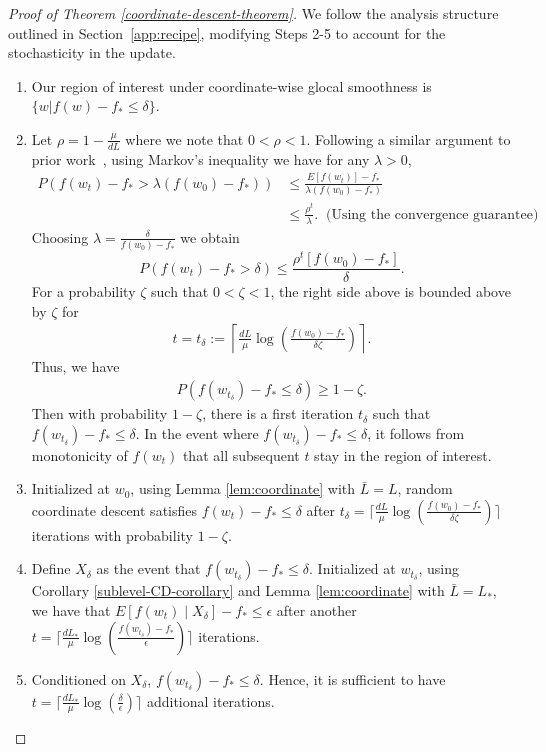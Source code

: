 \documentclass[10pt]{article} %
\begin{document}
\begin{proof}[Proof of Theorem \ref{coordinate-descent-theorem}]
We follow the analysis structure outlined in Section~\ref{app:recipe}, modifying Steps 2-5 to account for the stochasticity in the update.
\begin{enumerate}
\item Our region of interest under coordinate-wise glocal smoothness is $\{w \vert f(w) - f_* \leq \delta\}$.
\item Let $\rho = 1 - \frac{\mu}{dL}$ where we note that $0 < \rho < 1$. Following a similar argument to prior work~\cite[Theorem~5]{konevcny2017semi}, using Markov's inequality we have for any $\lambda > 0$,
          \begin{align*}
              P(f(w_t) - f_* > \lambda (f(w_0) - f_*))
               & \leq \frac{E[f(w_t)] - f_*}{\lambda (f(w_0) - f_*)} \\
               & \leq \frac{\rho^{t}}{\lambda}. \; \; \text{(Using the convergence guarantee)}
          \end{align*}
Choosing $\lambda = \frac{\delta}{f(w_0) - f_*}$ we obtain 
\[
P(f(w_t) - f_* > \delta) \leq \frac{\rho^t[f(w_0) - f_*]}{\delta}.
\]
For a probability $\zeta$ such that $0 < \zeta < 1$, the right side above is bounded above by $\zeta$ for
          \begin{align*}
          \label{eq:coord-hp}
              t = t_\delta := \left\lceil\frac{dL}{\mu}\log\left(\frac{f(w_0) - f_*}{\delta\zeta}\right)\right\rceil.
          \end{align*} Thus, we have
          \begin{align*}
              P(f(w_{t_\delta}) - f_*  \leq \delta) \geq 1 - \zeta.
          \end{align*} 
Then with probability $1 - \zeta$, there is a first iteration $t_\delta$ such that $f(w_{t_\delta}) - f_* \leq \delta$. In the event where $f(w_{t_\delta}) -  f_* \leq \delta$, it follows from monotonicity of $f(w_t)$ that all subsequent $t$ stay in the region of interest.
\item Initialized at $w_0$, using Lemma \ref{lem:coordinate} with $\bar{L} = L$, random coordinate descent satisfies $f(w_t) - f_{*} \leq \delta$ after $t_\delta = \lceil \frac{dL}{\mu}\log\left(\frac{f(w_0) - f_*}{\delta\zeta}\right) \rceil$ iterations with probability $1 - \zeta$. 
\item Define $X_{\delta}$ as the event that $f(w_{t_{\delta}}) - f_{*} \leq \delta$. Initialized at $w_{t_\delta}$, using Corollary \ref{sublevel-CD-corollary} and Lemma \ref{lem:coordinate} with $\bar{L} = L_{*}$, we have that $E[f(w_t)\;|\;X_{\delta}] - f_{*} \leq \epsilon$ after another $t = \lceil \frac{dL_{*}}{\mu}\log\left(\frac{f(w_{t_\delta}) - f_*}{\epsilon}\right) \rceil$ iterations.
\item Conditioned on $X_\delta$, $f(w_{t_\delta}) - f_* \leq \delta$. Hence, it is sufficient to have $t = \lceil \frac{dL_{*}}{\mu}\log\left(\frac{\delta}{\epsilon}\right) \rceil$ additional iterations.
\end{enumerate}
\end{proof}
\end{document}

